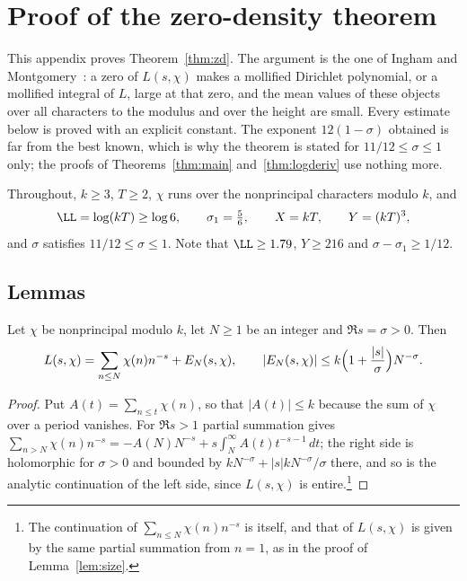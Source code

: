 \appendix

\section{Proof of the zero-density theorem}\label{app:zd}

This appendix proves Theorem~\ref{thm:zd}. The argument is the one of Ingham and Montgomery~\cite{Ing40,Mon71}: a zero of $L(s,\chi)$ makes a mollified Dirichlet polynomial, or a mollified integral of $L$, large at that zero, and the mean values of these objects over all characters to the modulus and over the height are small. Every estimate below is proved with an explicit constant. The exponent $12(1-\sigma)$ obtained is far from the best known, which is why the theorem is stated for $11/12\le\sigma\le1$ only; the proofs of Theorems~\ref{thm:main} and~\ref{thm:logderiv} use nothing more.

Throughout, $k\ge3$, $T\ge2$, $\chi$ runs over the nonprincipal characters modulo $k$, and
\[
  \LL=\log(kT)\ge\log6,\qquad \sigma_1=\tfrac56,\qquad X=kT,\qquad Y=(kT)^3,
\]
and $\sigma$ satisfies $11/12\le\sigma\le1$. Note that $\LL\ge1.79$, $Y\ge216$ and $\sigma-\sigma_1\ge1/12$.

\subsection{Lemmas}

\begin{lemma}\label{lem:truncation}
Let $\chi$ be nonprincipal modulo $k$, let $N\ge1$ be an integer and $\Re s=\sigma>0$. Then
\[
  L(s,\chi)=\sum_{n\le N}\chi(n)n^{-s}+E_N(s,\chi),\qquad |E_N(s,\chi)|\le k\Bigl(1+\frac{|s|}{\sigma}\Bigr)N^{-\sigma}.
\]
\end{lemma}

\begin{proof}
Put $A(t)=\sum_{n\le t}\chi(n)$, so that $|A(t)|\le k$ because the sum of $\chi$ over a period vanishes. For $\Re s>1$ partial summation gives $\sum_{n>N}\chi(n)n^{-s}=-A(N)N^{-s}+s\int_N^\infty A(t)t^{-s-1}\,dt$; the right side is holomorphic for $\sigma>0$ and bounded by $kN^{-\sigma}+|s|kN^{-\sigma}/\sigma$ there, and so is the analytic continuation of the left side, since $L(s,\chi)$ is entire.\footnote{The continuation of $\sum_{n\le N}\chi(n)n^{-s}$ is itself, and that of $L(s,\chi)$ is given by the same partial summation from $n=1$, as in the proof of Lemma~\ref{lem:size}.}
\end{proof}

